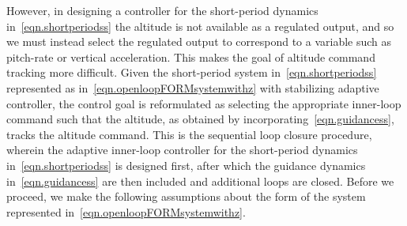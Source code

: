 \documentclass[]{../sty/aiaa-tc}
\theoremstyle{examplestyle}
\begin{document}
  However, in designing a controller for the short-period dynamics in\ \eqref{eqn.shortperiodss} the altitude is not available as a regulated output, and so we must instead select the regulated output to correspond to a variable such as pitch-rate or vertical acceleration.
  This makes the goal of altitude command tracking more difficult.
  Given the short-period system in\ \eqref{eqn.shortperiodss} represented as in\ \eqref{eqn.openloopFORMsystemwithz} with stabilizing adaptive controller, the control goal is reformulated as selecting the appropriate inner-loop command such that the altitude, as obtained by incorporating\ \eqref{eqn.guidancess}, tracks the altitude command.
  This is the sequential loop closure procedure, wherein the adaptive inner-loop controller for the short-period dynamics in\ \eqref{eqn.shortperiodss} is designed first, after which the guidance dynamics in\ \eqref{eqn.guidancess} are then included and additional loops are closed.
  Before we proceed, we make the following assumptions about the form of the system represented in\ \eqref{eqn.openloopFORMsystemwithz}.
\end{document}
